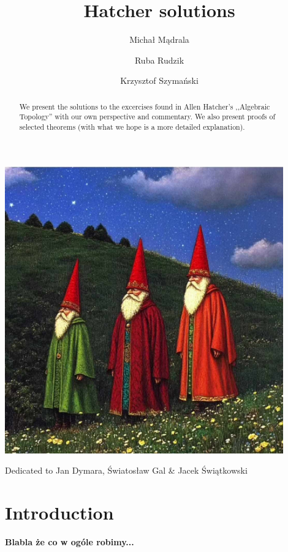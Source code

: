 \documentclass[11pt, a4paper, final]{amsart}
\title{Hatcher solutions}
\author{Michał Mądrala}
\author{Ruba Rudzik}
\author{Krzysztof Szymański}
\newcommand\todo[1]{\textbf{\textcolor{redd}{#1}}}
\numberwithin{theorem}{section}
\theoremstyle{definition}
\theoremstyle{remark}
\begin{document}
	\begin{abstract}
	       We present the solutions to the excercises found in Allen Hatcher's ,,Algebraic Topology'' \cite{AH} with our own perspective and commentary. We also present proofs of selected theorems (with what we hope is a more detailed explanation). 
	\end{abstract}
	
\maketitle

\begin{center}
    \includegraphics[width=120mm]{images/jd_śwg_jśw.jpg}
\end{center}

\begin{center}
    {\selectfont Dedicated to Jan Dymara, Światosław Gal \& Jacek Świątkowski}
\end{center} 

\newpage

\section{Introduction}

\todo{Blabla że co w ogóle robimy...}
\end{document}

